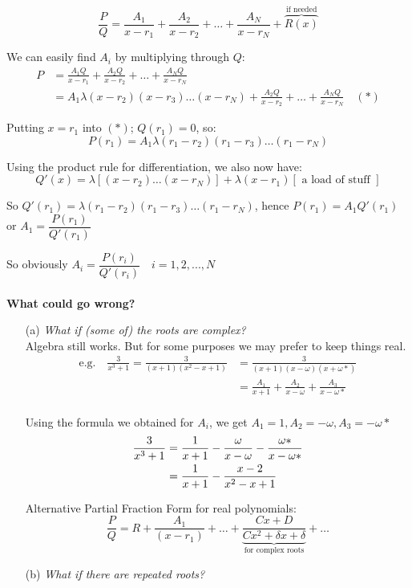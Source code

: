 \[\frac{P}{Q} = \frac{A_1}{x-r_1} + \frac{A_2}{x-r_2} + \dots + \frac{A_N}{x-r_N} + \overbrace{R(x)}^\text{if needed} \]

We can easily find $A_i$ by multiplying through $Q$:
\begin{align} \nonumber P &= \frac{A_1Q}{x-r_1} + \frac{A_2Q}{x-r_2} + \dots + \frac{A_NQ}{x-r_N}\\ \nonumber
&= A_1 \lambda(x-r_2)(x-r_3)\dots(x-r_N) + \frac{A_2Q}{x-r_2} + \dots + \frac{A_NQ}{x-r_N} \quad (*)
\end{align}

Putting $x = r_1$ into $(*)$; $Q(r_1) = 0$, so:
\[P(r_1) = A_1 \lambda (r_1 - r_2)(r_1 - r_3)\dots(r_1 - r_N) \]

Using the product rule for differentiation, we also now have:
\[
Q'(x) = \lambda[(x-r_2)\dots(x-r_N)] + \lambda(x-r_1)[\text{ a load of stuff }]
\]

So $Q'(r_1) = \lambda(r_1-r_2)(r_1-r_3)\dots(r_1-r_N)$, hence $P(r_1) = A_1Q'(r_1)$ or $A_1 = \dfrac{P(r_1)}{Q'(r_1)}$

So obviously $\boxed{A_i = \dfrac{P(r_i)}{Q'(r_i)} \quad i = 1,2,...,N}$\\\\

\textbf{What could go wrong?}

\begin{itemize}
\item[(a)] \textit{What if (some of) the roots are complex?}\\
Algebra still works. But for some purposes we may prefer to keep things real.
\[ \begin{align} \nonumber \text{e.g.}\quad \frac{3}{x^3+1} = \frac{3}{(x+1)(x^2 - x + 1)} &= \frac{3}{(x+1)(x-\omega)(x+\omega *)} \\ \nonumber
 &= \frac{A_1}{x+1} + \frac{A_2}{x - \omega} + \frac{A_3}{x - \omega *}\\
 \end{align}
\] 

Using the formula we obtained for $A_i$, we get $A_1 = 1, A_2 = -\omega, A_3 = -\omega *$
\[\begin{align} \nonumber \frac{3}{x^3 + 1} &= \frac{1}{x+1} - \frac{\omega}{x-\omega} - \frac{\omega *}{x - \omega *} \\\vspace*{5pt} \nonumber
&= \frac{1}{x+1}  - \frac{x-2}{x^2 - x + 1} \end{align}\]

Alternative Partial Fraction Form for real polynomials:
\[\frac{P}{Q} = R + \frac{A_1}{(x-r_1)} + \dots + \underbrace{\frac{Cx + D}{Cx^2 + \delta x + \delta}}_\text{for complex roots} + \dots \]

\item[(b)] \textit{What if there are repeated roots?}

\end{itemize}


